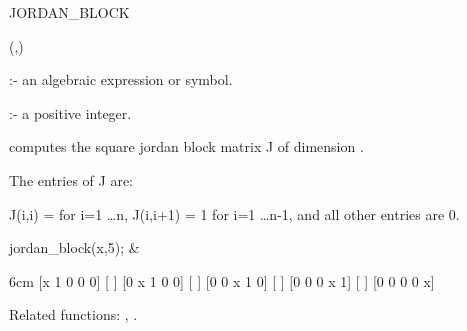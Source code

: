 \begin{Operator}[jordanblock]{JORDAN_BLOCK}

\begin{Syntax}
(,)
\end{Syntax}

         :- an algebraic expression or symbol. 

 :- a positive integer.

 computes the square jordan block matrix J of 
dimension . 

The entries of J are:

                J(i,i) =  for i=1 
                \ldots n, J(i,i+1) = 1 for i=1 
                \ldots n-1, and all other entries are 0.

\begin{Examples}

jordan\_block(x,5); &
\begin{multilineoutput}{6cm}
[x  1  0  0  0]
[             ]
[0  x  1  0  0]
[             ]
[0  0  x  1  0]
[             ]
[0  0  0  x  1]
[             ]
[0  0  0  0  x]
\end{multilineoutput}

\end{Examples}

Related functions: , .

\end{Operator}


